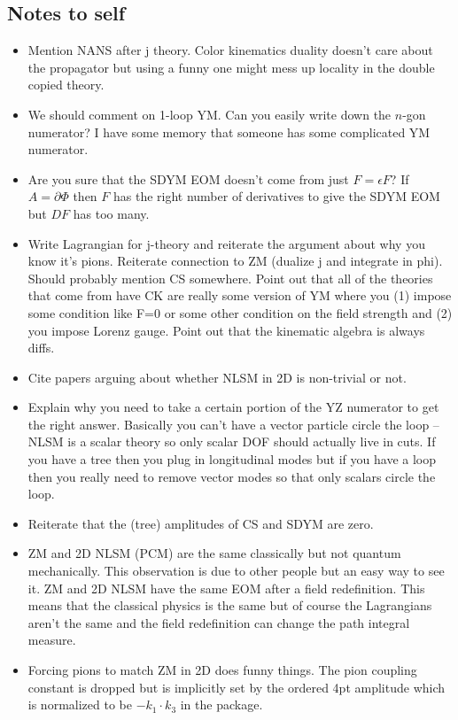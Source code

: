 \documentclass[11pt,letter]{article}
\begin{document}
\subsection{Notes to self}
\begin{itemize}
\item Mention NANS after j theory.  Color kinematics duality doesn't care about the propagator but using a funny one might mess up locality in the double copied theory.
\item We should comment on 1-loop YM.  Can you easily write down the $n$-gon numerator?  I have some memory that someone has some complicated YM numerator.
\item Are you sure that the SDYM EOM doesn't come from just $F=\epsilon F$?  If $A=\partial \Phi$ then $F$ has the right number of derivatives to give the SDYM EOM but $DF$ has too many.
\item Write Lagrangian for j-theory and reiterate the argument about why you know it's pions.  Reiterate connection to ZM (dualize j and integrate in phi).  Should probably mention CS somewhere.  Point out that all of the theories that come from have CK are really some version of YM where you (1) impose some condition like F=0 or some other condition on the field strength and (2) you impose Lorenz gauge.  Point out that the kinematic algebra is always diffs.
\item Cite papers arguing about whether NLSM in 2D is non-trivial or not.
\item Explain why you need to take a certain portion of the YZ numerator to get the right answer.  Basically you can't have a vector particle circle the loop -- NLSM is a scalar theory so only scalar DOF should actually live in cuts.  If you have a tree then you plug in longitudinal modes but if you have a loop then you really need to remove vector modes so that only scalars circle the loop.
\item Reiterate that the (tree) amplitudes of CS and SDYM are zero.
\item ZM and 2D NLSM (PCM) are the same classically but not quantum mechanically.
This observation is due to other people but an easy way to see it.
ZM and 2D NLSM have the same EOM after a field redefinition.
This means that the classical physics is the same but of course the Lagrangians aren't the same and the field redefinition can change the path integral measure.
\item Forcing pions to match ZM in 2D does funny things.
The pion coupling constant is dropped but is implicitly set by the ordered 4pt amplitude which is normalized to be $-k_1 \cdot k_3$ in the package.

\end{itemize}
\end{document}
